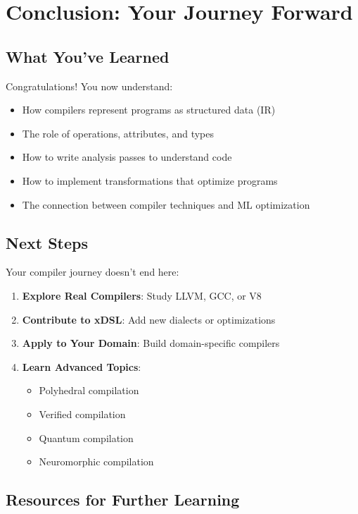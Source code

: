 \documentclass[11pt,a4paper]{article}
\begin{document}
\section{Conclusion: Your Journey Forward}

\subsection{What You've Learned}

Congratulations! You now understand:
\begin{itemize}
    \item How compilers represent programs as structured data (IR)
    \item The role of operations, attributes, and types
    \item How to write analysis passes to understand code
    \item How to implement transformations that optimize programs
    \item The connection between compiler techniques and ML optimization
\end{itemize}

\subsection{Next Steps}

Your compiler journey doesn't end here:

\begin{enumerate}
    \item \textbf{Explore Real Compilers}: Study LLVM, GCC, or V8
    \item \textbf{Contribute to xDSL}: Add new dialects or optimizations
    \item \textbf{Apply to Your Domain}: Build domain-specific compilers
    \item \textbf{Learn Advanced Topics}:
    \begin{itemize}
        \item Polyhedral compilation
        \item Verified compilation
        \item Quantum compilation
        \item Neuromorphic compilation
    \end{itemize}
\end{enumerate}

\subsection{Resources for Further Learning}
\end{document}
